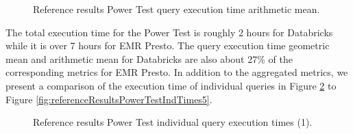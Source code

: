 \begin{figure}
   \begin{center}
   \end{center}
   \caption{Reference results Power Test query execution time arithmetic mean.}
   \label{fig:referenceResultsPowerTestArithmeticMean}
\end{figure}

The total execution time for the Power Test is roughly 2 hours for Databricks while it is over 7 hours for EMR Presto. The query execution time geometric mean and arithmetic mean for Databricks are also about 27\% of the corresponding metrics for EMR Presto. In addition to the aggregated metrics, we present a comparison of the execution time of individual queries in Figure \ref{fig:referenceResultsPowerTestIndTimes1} to Figure \ref{fig:referenceResultsPowerTestIndTimes5}.

\begin{figure}
   \begin{center}
   \end{center}
   \caption{Reference results Power Test individual query execution times (1).}
   \label{fig:referenceResultsPowerTestIndTimes1}
\end{figure}

